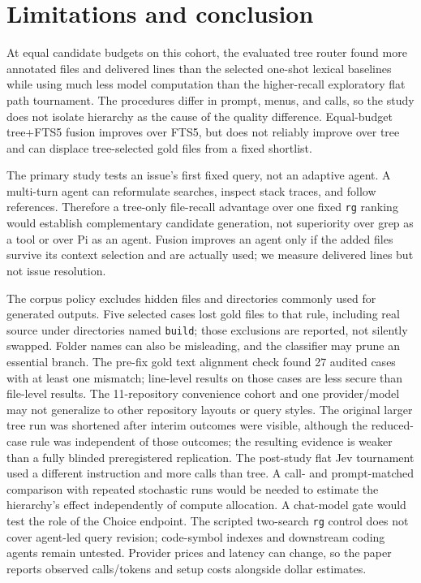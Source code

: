 \documentclass[
]{article}
\begin{document}
\section{Limitations and conclusion}\label{limitations-and-conclusion}

At equal candidate budgets on this cohort, the evaluated tree router
found more annotated files and delivered lines than the selected
one-shot lexical baselines while using much less model computation than
the higher-recall exploratory flat path tournament. The procedures
differ in prompt, menus, and calls, so the study does not isolate
hierarchy as the cause of the quality difference. Equal-budget
tree+FTS5 fusion improves over FTS5, but does not reliably improve over
tree and can displace tree-selected gold files from a fixed shortlist.

The primary study tests an issue's first fixed query, not an adaptive agent. A
multi-turn agent can reformulate searches, inspect stack traces, and
follow references. Therefore a tree-only file-recall advantage over one
fixed \texttt{rg} ranking would establish complementary candidate
generation, not superiority over grep as a tool or over Pi as an agent.
Fusion improves an agent only if the added files survive its context
selection and are actually used; we measure delivered lines but not
issue resolution.

The corpus policy excludes hidden files and directories commonly used
for generated outputs. Five selected cases lost gold files to that rule,
including real source under directories named \texttt{build}; those
exclusions are reported, not silently swapped. Folder names can also be
misleading, and the classifier may prune an essential branch. The
pre-fix gold text alignment check found 27 audited cases with at least
one mismatch; line-level results on those cases are less secure than
file-level results. The 11-repository convenience cohort and one
provider/model may not generalize to other repository layouts or query
styles. The original larger tree run was shortened after interim
outcomes were visible, although the reduced-case rule was independent of
those outcomes; the resulting evidence is weaker than a fully blinded
preregistered replication. The post-study flat Jev tournament used a
different instruction and more calls than tree. A call- and
prompt-matched comparison with repeated stochastic runs would be needed
to estimate the hierarchy's effect independently of compute allocation.
A chat-model gate would test the role of the Choice endpoint. The
scripted two-search \texttt{rg} control does not cover agent-led query
revision; code-symbol indexes and downstream coding agents remain
untested. Provider prices and latency can change, so the paper
reports observed calls/tokens and setup costs alongside dollar
estimates.
\end{document}
